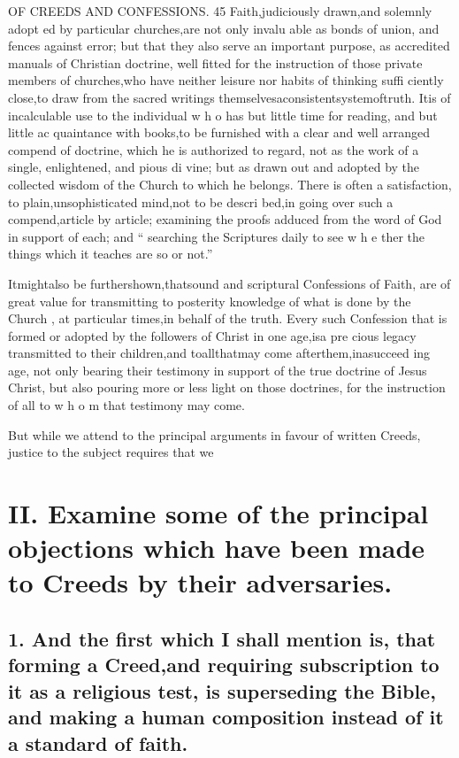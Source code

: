 \documentclass[
]{book}
\begin{document}
OF CREEDS AND CONFESSIONS. 45
Faith,judiciously drawn,and solemnly adopt ed by particular churches,are not only invalu able as bonds of union, and fences against error; but that they also serve an important purpose, as accredited manuals of Christian doctrine, well fitted for the instruction of those private members of churches,who have neither leisure nor habits of thinking suffi ciently close,to draw from the sacred writings themselvesaconsistentsystemoftruth. Itis of incalculable use to the individual w h o has
but little time for reading, and but little ac quaintance with books,to be furnished with a
clear and well arranged compend of doctrine, which he is authorized to regard, not as the
work of a single, enlightened, and pious di vine; but as drawn out and adopted by the collected wisdom of the Church to which he
belongs. There is often a satisfaction, to plain,unsophisticated mind,not to be descri
bed,in going over such a compend,article by article; examining the proofs adduced from the word of God in support of each; and `` searching the Scriptures daily to see w h e
ther the things which it teaches are so or not.''

Itmightalso be furthershown,thatsound and scriptural Confessions of Faith, are of great value for transmitting to posterity knowledge of what is done by the Church , at particular times,in behalf of the truth. Every such Confession that is formed or adopted by the followers of Christ in one age,isa pre
cious legacy transmitted to their children,and toallthatmay come afterthem,inasucceed ing age, not only bearing their testimony in support of the true doctrine of Jesus Christ,
but also pouring more or less light on those doctrines, for the instruction of all to w h o m that testimony may come.

But while we attend to the principal arguments in favour of written Creeds, justice to the subject requires that we

\hypertarget{ii.-examine-some-of-the-principal-objections-which-have-been-made-to-creeds-by-their-adversaries.}{%
\section{II. Examine some of the principal objections which have been made to Creeds by their adversaries.}\label{ii.-examine-some-of-the-principal-objections-which-have-been-made-to-creeds-by-their-adversaries.}}

\hypertarget{and-the-first-which-i-shall-mention-is-that-forming-a-creedand-requiring-subscription-to-it-as-a-religious-test-is-superseding-the-bible-and-making-a-human-composition-instead-of-it-a-standard-of-faith.}{%
\subsection{1. And the first which I shall mention is, that forming a Creed,and requiring subscription to it as a religious test, is superseding the Bible, and making a human composition instead of it a standard of faith.}\label{and-the-first-which-i-shall-mention-is-that-forming-a-creedand-requiring-subscription-to-it-as-a-religious-test-is-superseding-the-bible-and-making-a-human-composition-instead-of-it-a-standard-of-faith.}}
\end{document}
